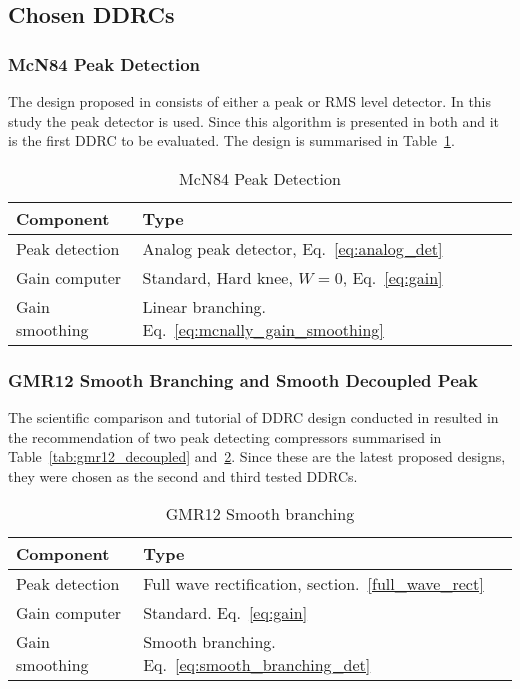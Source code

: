 \documentclass[../main2.tex]{subfiles}
\begin{document}
\subsection{Chosen DDRCs} \label{method_chosen_DDRC}
\subsubsection{McN84 Peak Detection}
The design proposed in \cite{mcnally1984dynamic} consists of either a peak or RMS level detector. In this study the peak detector is used. Since this algorithm is presented in both \cite{zolzer2008digital} and \cite{dafx11} it is the first DDRC to be evaluated.  The design is summarised in Table~\ref{tab:mcn84}.
\begin{table}[h]
\begin{center}
\caption{McN84 Peak Detection}
\label{tab:mcn84}
\begin{tabular}{| l | l |}
	\hline
	Component & Type \\ \hline
	Peak detection & Analog peak detector, Eq.~\eqref{eq:analog_det} \\
	Gain computer & Standard, Hard knee, $W=0$, Eq.~\eqref{eq:gain} \\
	Gain smoothing & Linear branching. Eq.~\eqref{eq:mcnally_gain_smoothing} \\
	\hline
\end{tabular}
\end{center}
\end{table}
\subsubsection{GMR12 Smooth Branching and Smooth Decoupled Peak}
The scientific comparison and tutorial of DDRC design conducted in \cite{reiss2012tutorial} resulted in the recommendation of two peak detecting compressors summarised in Table~\ref{tab:gmr12_decoupled} and~\ref{tab:gmr12_branching}. Since these are the latest proposed designs, they were chosen as the second and third tested DDRCs.
\begin{table}[h]
\begin{center}
\caption{GMR12 Smooth branching}
\label{tab:gmr12_branching}
\begin{tabular}{| l | l |}
	\hline
	Component & Type \\ \hline
	Peak detection & Full wave rectification, section.~\ref{full_wave_rect} \\
	Gain computer & Standard. Eq.~\eqref{eq:gain} \\
	Gain smoothing & Smooth branching. Eq.~\eqref{eq:smooth_branching_det} \\
	\hline
\end{tabular}
\end{center}
\end{table}
\end{document}
